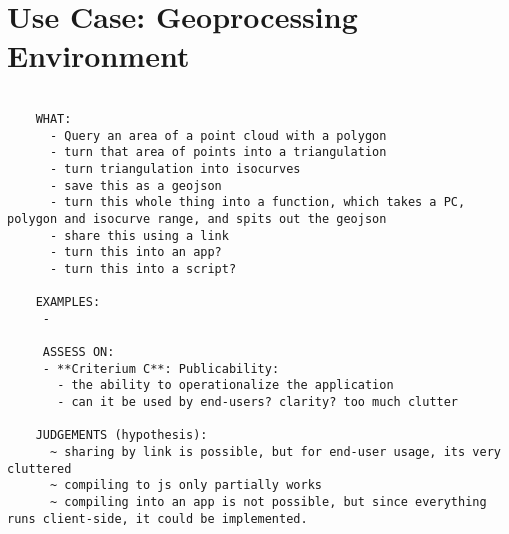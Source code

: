 \section{Use Case: Geoprocessing Environment}%
\begin{lstlisting}

    WHAT:
      - Query an area of a point cloud with a polygon
      - turn that area of points into a triangulation
      - turn triangulation into isocurves
      - save this as a geojson
      - turn this whole thing into a function, which takes a PC, polygon and isocurve range, and spits out the geojson
      - share this using a link
      - turn this into an app?
      - turn this into a script?

    EXAMPLES: 
     - 

     ASSESS ON:
     - **Criterium C**: Publicability:
       - the ability to operationalize the application 
       - can it be used by end-users? clarity? too much clutter

    JUDGEMENTS (hypothesis): 
      ~ sharing by link is possible, but for end-user usage, its very cluttered 
      ~ compiling to js only partially works
      ~ compiling into an app is not possible, but since everything runs client-side, it could be implemented. 

\end{lstlisting}

